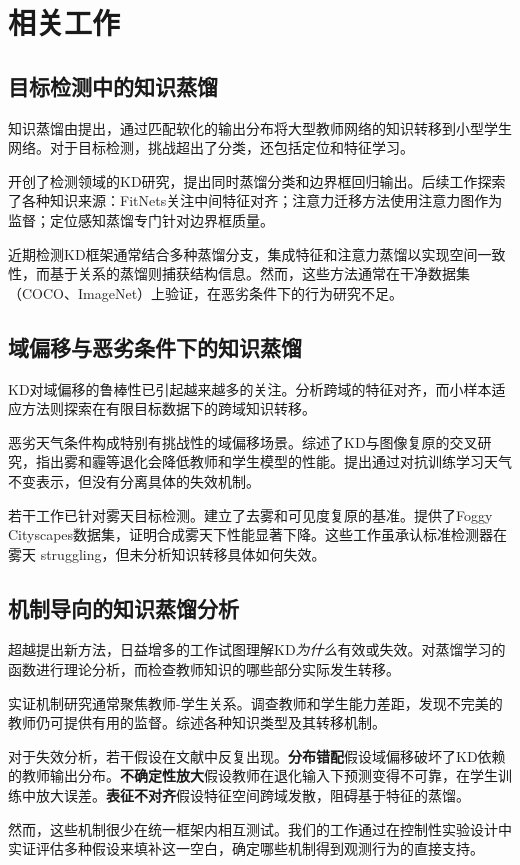 \section{相关工作}
\label{sec:related}

\subsection{目标检测中的知识蒸馏}

知识蒸馏由\cite{hinton2015distilling}提出，通过匹配软化的输出分布将大型教师网络的知识转移到小型学生网络。对于目标检测，挑战超出了分类，还包括定位和特征学习。

\cite{chen2017learning}开创了检测领域的KD研究，提出同时蒸馏分类和边界框回归输出。后续工作探索了各种知识来源：FitNets\cite{romero2014fitnets}关注中间特征对齐；注意力迁移方法\cite{zagoruyko2016paying}使用注意力图作为监督；定位感知蒸馏\cite{dai2021general}专门针对边界框质量。

近期检测KD框架通常结合多种蒸馏分支，集成特征和注意力蒸馏以实现空间一致性，而基于关系的蒸馏则捕获结构信息。然而，这些方法通常在干净数据集（COCO、ImageNet）上验证，在恶劣条件下的行为研究不足。

\subsection{域偏移与恶劣条件下的知识蒸馏}

KD对域偏移的鲁棒性已引起越来越多的关注。\cite{sun2016deep}分析跨域的特征对齐，而小样本适应方法则探索在有限目标数据下的跨域知识转移\cite{mirzadeh2020improved}。

恶劣天气条件构成特别有挑战性的域偏移场景。\cite{guo2021meets}综述了KD与图像复原的交叉研究，指出雾和霾等退化会降低教师和学生模型的性能。\cite{du2022learning}提出通过对抗训练学习天气不变表示，但没有分离具体的失效机制。

若干工作已针对雾天目标检测。\cite{li2018benchmarking}建立了去雾和可见度复原的基准。\cite{sakaridis2018semantic}提供了Foggy Cityscapes数据集，证明合成雾天下性能显著下降。这些工作虽承认标准检测器在雾天 struggling，但未分析知识转移具体如何失效。

\subsection{机制导向的知识蒸馏分析}

超越提出新方法，日益增多的工作试图理解KD\emph{为什么}有效或失效。\cite{phuong2019functional}对蒸馏学习的函数进行理论分析，而\cite{cho2019efficacy}检查教师知识的哪些部分实际发生转移。

实证机制研究通常聚焦教师-学生关系。\cite{mirzadeh2020improved}调查教师和学生能力差距，发现不完美的教师仍可提供有用的监督。\cite{gou2021knowledge}综述各种知识类型及其转移机制。

对于失效分析，若干假设在文献中反复出现。\textbf{分布错配}假设域偏移破坏了KD依赖的教师输出分布\cite{wang2020cross}。\textbf{不确定性放大}假设教师在退化输入下预测变得不可靠，在学生训练中放大误差\cite{kendall2017uncertainties}。\textbf{表征不对齐}假设特征空间跨域发散，阻碍基于特征的蒸馏\cite{sun2016deep}。

然而，这些机制很少在统一框架内相互测试。我们的工作通过在控制性实验设计中实证评估多种假设来填补这一空白，确定哪些机制得到观测行为的直接支持。
